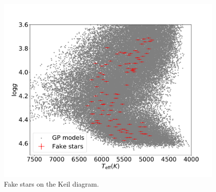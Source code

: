 \section{}

\subsection{}

\begin{figure}
	\includegraphics[width=1.0\columnwidth]{fake-stars-on-hrd.pdf}
    \caption{Fake stars on the Keil diagram. } 
  \label{fig:fit_comparison}
\end{figure}




